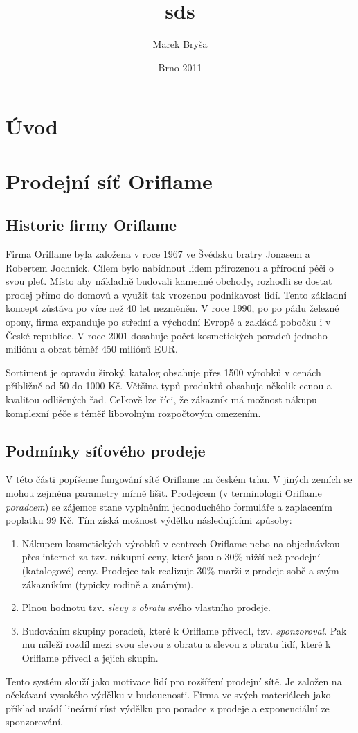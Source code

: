 \documentclass[a4wide,12pt]{report}
\title{sds}
\author{Marek Bryša}
\date{Brno 2011}
\begin{document}
\tableofcontents

\chapter*{Úvod}
\chapter{Prodejní síť Oriflame}
\section{Historie firmy Oriflame}
Firma Oriflame byla založena v roce 1967 ve Švédsku bratry Jonasem a Robertem Jochnick. Cílem bylo nabídnout lidem přirozenou a přírodní péči o svou pleť. Místo aby nákladně budovali kamenné obchody, rozhodli se dostat prodej přímo do domovů a využít tak vrozenou podnikavost lidí. Tento základní koncept zůstáva po více než 40 let nezměněn. V roce 1990, po po pádu železné opony, firma expanduje po střední a východní Evropě a zakládá pobočku i v České republice. V roce 2001 dosahuje počet kosmetických poradců jednoho miliónu a obrat téměř 450 miliónů EUR.

Sortiment je opravdu široký, katalog obsahuje přes 1500 výrobků v cenách přibližně od 50 do 1000 Kč. Většina typů produktů obsahuje několik cenou a kvalitou odlišených řad. Celkově lze říci, že zákazník má možnost nákupu komplexní péče s téměř libovolným rozpočtovým omezením.
\section{Podmínky síťového prodeje}
V této části popíšeme fungování sítě Oriflame na českém trhu. V jiných zemích se mohou zejména parametry mírně lišit. Prodejcem (v terminologii Oriflame \emph{poradcem}) se zájemce stane vyplněním jednoduchého formuláře a zaplacením poplatku 99 Kč. Tím získá možnost výdělku následujícími způsoby:
\begin{enumerate}
\item Nákupem kosmetických výrobků v centrech Oriflame nebo na objednávkou přes internet za tzv. nákupní ceny, které jsou o 30\% nižší než prodejní (katalogové) ceny. Prodejce tak realizuje 30\% marži z prodeje sobě a svým zákazníkům (typicky rodině a známým).
\item Plnou hodnotu tzv. \emph{slevy z obratu} svého vlastního prodeje.
\item Budováním skupiny poradců, které k Oriflame přivedl, tzv. \emph{sponzoroval}. Pak mu náleží rozdíl mezi svou slevou z obratu a slevou z obratu lidí, které k Oriflame přivedl a jejich skupin.
\end{enumerate}
Tento systém slouží jako motivace lidí pro rozšíření prodejní sítě. Je založen na očekávaní vysokého výdělku v budoucnosti. Firma ve svých materiálech jako příklad uvádí lineární růst výdělku pro poradce z prodeje a exponenciální ze sponzorování.
\end{document}

